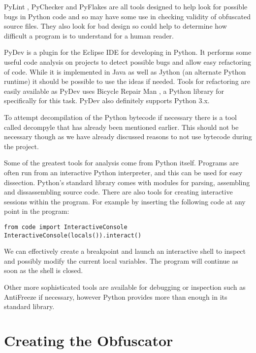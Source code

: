 \documentclass{report}
\begin{document}
PyLint \cite{pylint}, PyChecker \cite{pychecker} and PyFlakes \cite{pyflakes} are all tools designed to help look for possible
bugs in Python code and so may have some use in checking validity of obfuscated source files. They also look for bad design so
could help to determine how difficult a program is to understand for a human reader.

PyDev \cite{pydev} is a plugin for the Eclipse IDE for developing in Python. It performs some useful code analysis on projects to detect
possible bugs and allow easy refactoring of code. While it is implemented in Java as well as Jython (an alternate Python runtime)
it should be possible to use the ideas if needed. Tools for refactoring are easily available as PyDev uses Bicycle Repair
Man \cite{bikerepair}, a Python library for specifically for this task. PyDev also definitely supports Python 3.x.

To attempt decompilation of the Python bytecode if necessary there is a tool called decompyle \cite{decompyle} that has already been
mentioned earlier. This should not be necessary though as we have already discussed reasons to not use bytecode during the project.

Some of the greatest  tools for analysis come from Python itself. Programs are often run from an interactive Python interpreter, and this
can be used for easy dissection. Python's standard library comes with modules for parsing, assembling and dissassembling source code.
There are also tools for creating interactive sessions within the program. For example by inserting the following code at any point
in the program:

\begin{lstlisting}
from code import InteractiveConsole
InteractiveConsole(locals()).interact()
\end{lstlisting}

We can effectively create a breakpoint and launch an interactive shell to inspect and possibly modify the current local
variables. The program will continue as soon as the shell is closed.

Other more sophisticated tools are available for debugging or inspection such as AntiFreeze \cite{pirates} if necessary,
however Python provides more than enough in its standard library.

\section{Creating the Obfuscator}
\end{document}
